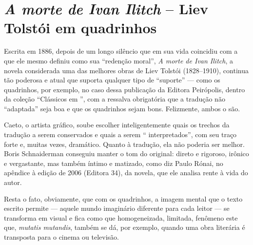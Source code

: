\chapter{\emph{A morte de Ivan Ilitch} -- Liev Tolstói em quadrinhos}

Escrita em 1886, depois de um longo silêncio que em sua vida coincidiu
com a que ele mesmo definiu como sua ``redenção moral'', \emph{A morte
de Ivan Ilitch}, a novela considerada uma das melhores obras de Liev
Tolstói (1828--1910), continua tão poderosa e atual que suporta qualquer
tipo de ``suporte'' --- como os quadrinhos, por exemplo, no caso dessa
publicação da Editora Peirópolis, dentro da coleção ``Clássicos em
'', com a ressalva obrigatória que a tradução não ``adaptada'' seja
boa e que os quadrinhos sejam bons. Felizmente, ambos o são.

Caeto, o artista gráfico, soube escolher inteligentemente quais os
trechos da tradução a serem conservados e quais a serem ``
interpretados'', com seu traço forte e, muitas vezes, dramático. Quanto
à tradução, ela não poderia ser melhor. Boris Schnaiderman conseguiu
manter o tom do original: direto e rigoroso, irônico e vergastante, mas
também íntimo e matizado, como diz Paulo Rónai, no apêndice à edição de
2006 (Editora 34), da novela, que ele analisa rente à vida do autor.

Resta o fato, obviamente, que com os quadrinhos, a imagem mental que o
texto escrito permite --- aquele mundo imaginário diferente para cada
leitor --- se transforma em visual e fica como que homogeneizada,
limitada, fenômeno este que, \emph{mutatis mutandis}, também se dá, por
exemplo, quando uma obra literária é transposta para o cinema ou televisão.

